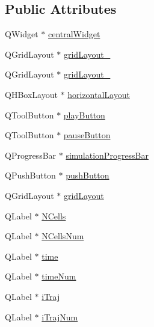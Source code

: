 \subsection*{\-Public \-Attributes}
\begin{DoxyCompactItemize}
\item 
\-Q\-Widget $\ast$ \hyperlink{class_ui___main_window_a30075506c2116c3ed4ff25e07ae75f81}{central\-Widget}
\item 
\-Q\-Grid\-Layout $\ast$ \hyperlink{class_ui___main_window_af42ea7d4c2e893181caad21e28166932}{grid\-Layout\-\_}
\item 
\-Q\-Grid\-Layout $\ast$ \hyperlink{class_ui___main_window_a6b2a0c5f7e8ff2a87134908dd770d2d2}{grid\-Layout\-\_}
\item 
\-Q\-H\-Box\-Layout $\ast$ \hyperlink{class_ui___main_window_acd6fdc9ebacc4b25b834162380d75ce8}{horizontal\-Layout}
\item 
\-Q\-Tool\-Button $\ast$ \hyperlink{class_ui___main_window_a9b4aced7d5563bf1ee62d944215a9a92}{play\-Button}
\item 
\-Q\-Tool\-Button $\ast$ \hyperlink{class_ui___main_window_adf0fe1ee3ae6e5766589c477c85ac16c}{pause\-Button}
\item 
\-Q\-Progress\-Bar $\ast$ \hyperlink{class_ui___main_window_a851cc4465d87a72d072b6559eb6b3a2a}{simulation\-Progress\-Bar}
\item 
\-Q\-Push\-Button $\ast$ \hyperlink{class_ui___main_window_ad332d93084584930878f1daf5f84cdbf}{push\-Button}
\item 
\-Q\-Grid\-Layout $\ast$ \hyperlink{class_ui___main_window_a525ed3c5fe0784ac502ee222fba4e205}{grid\-Layout}
\item 
\-Q\-Label $\ast$ \hyperlink{class_ui___main_window_aea754e8591e2a34ad9fd1b1a0d70a3ff}{\-N\-Cells}
\item 
\-Q\-Label $\ast$ \hyperlink{class_ui___main_window_a4f203fa20746d2f27d346c96a5ab9dd6}{\-N\-Cells\-Num}
\item 
\-Q\-Label $\ast$ \hyperlink{class_ui___main_window_a6b0d88d19ddcb52fec0cc1ed6a3e3d9c}{time}
\item 
\-Q\-Label $\ast$ \hyperlink{class_ui___main_window_a260f2ffc3170b0afd4162f5300f7153e}{time\-Num}
\item 
\-Q\-Label $\ast$ \hyperlink{class_ui___main_window_acb5251d8d9ed0c84133d2003a681dbce}{i\-Traj}
\item 
\-Q\-Label $\ast$ \hyperlink{class_ui___main_window_a48d251578b324caa31496795f0a1e678}{i\-Traj\-Num}
\item 

\end{DoxyCompactItemize}
